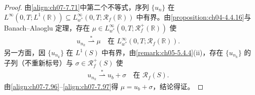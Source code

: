 \documentclass[../../main.tex]{subfiles}%
\begin{document}
\begin{proof}
由\eqref{align:ch07-7.71}中第二个不等式，序列 $\{u_n\}$ 在 $L^\infty(0,T;L^1(\mathbb{R}))\subseteq L^\infty_{w^*}(0,T;\mathscr{R}_f(\mathbb{R}))$ 中有界。由\cref{proposition:ch04-4.4.16}与 Banach--Alaoglu 定理，存在 $\mu\in L^\infty_{w^*}(0,T;\mathscr{R}_f^+(\mathbb{R}))$ 使
\begin{align}
u_{n_k}\stackrel{*}{\rightharpoonup}\mu\quad\text{在 }L^\infty_{w^*}(0,T;\mathscr{R}_f(\mathbb{R})). \label{align:ch07-7.96}
\end{align}
另一方面，因 $\{u_{n_k}\}$ 在 $L^1(S)$ 中有界，由\cref{remark:ch05-5.4.4}(ii)，存在 $\{u_{n_k}\}$ 的子列（不重新标号）与 $\sigma\in\mathscr{R}_f^+(S)$ 使
\begin{align}
u_{n_k}\stackrel{*}{\rightharpoonup}u_b+\sigma\quad\text{在 }\mathscr{R}_f(S). \label{align:ch07-7.97}
\end{align}
由\eqref{align:ch07-7.96}--\eqref{align:ch07-7.97}得 $\mu=u_b+\sigma$，结论得证。
\end{proof}
\end{document}
